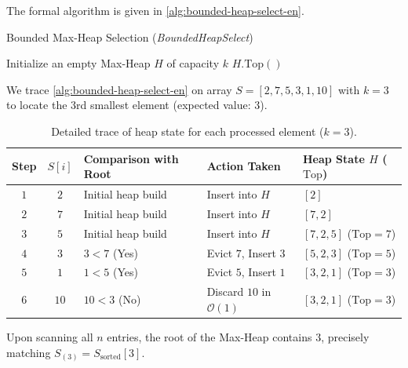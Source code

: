 The formal algorithm is given in \autoref{alg:bounded-heap-select-en}.

\begin{algorithm}[H]
\caption{Bounded Max-Heap Selection (\textit{BoundedHeapSelect})}
\label{alg:bounded-heap-select-en}

Initialize an empty Max-Heap $H$ of capacity $k$\;
\Return $H.\text{Top}()$ 
\end{algorithm}

\begin{example}
We trace \autoref{alg:bounded-heap-select-en} on array $S = [2, 7, 5, 3, 1, 10]$ with $k = 3$ to locate the 3rd smallest element (expected value: $3$).

\begin{table}[H]
  \centering
  \small
  \caption{Detailed trace of heap state for each processed element ($k=3$).}
  \label{tab:heap-selection-trace-en}
  \begin{tabularx}{\textwidth}{@{}>{\bfseries\arraybackslash}ccp{3.5cm}Yl@{}}
    \toprule
    Step & $S[i]$ & Comparison with Root & Action Taken & Heap State $H$ ($\text{Top}$) \\
    \midrule
    $1$ & $2$ & Initial heap build & Insert into $H$ & $[2]$ \\
    $2$ & $7$ & Initial heap build & Insert into $H$ & $[7, 2]$ \\
    $3$ & $5$ & Initial heap build & Insert into $H$ & $[7, 2, 5]$ ($\text{Top} = 7$) \\
    \midrule
    $4$ & $3$ & $3 < 7$ (Yes) & Evict $7$, Insert $3$ & $[5, 2, 3]$ ($\text{Top} = 5$) \\
    $5$ & $1$ & $1 < 5$ (Yes) & Evict $5$, Insert $1$ & $[3, 2, 1]$ ($\text{Top} = 3$) \\
    $6$ & $10$ & $10 < 3$ (No) & Discard $10$ in $\mathcal{O}(1)$ & $[3, 2, 1]$ ($\text{Top} = 3$) \\
    \bottomrule
  \end{tabularx}
\end{table}

Upon scanning all $n$ entries, the root of the Max-Heap contains $3$, precisely matching $S_{(3)} = S_{\text{sorted}}[3]$.
\end{example}

